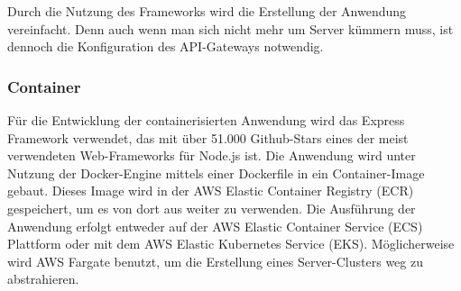 Durch die Nutzung des Frameworks wird die Erstellung der Anwendung vereinfacht. Denn auch wenn man sich nicht mehr um Server kümmern muss, ist dennoch die Konfiguration des API-Gateways notwendig.

\subsubsection{Container}
Für die Entwicklung der containerisierten Anwendung wird das Express Framework verwendet, das mit über 51.000 Github-Stars eines der meist verwendeten Web-Frameworks für Node.js ist. Die Anwendung wird unter Nutzung der Docker-Engine mittels einer Dockerfile in ein Container-Image gebaut. Dieses Image wird in der AWS Elastic Container Registry (ECR) gespeichert, um es von dort aus weiter zu verwenden. 
Die Ausführung der Anwendung erfolgt entweder auf der AWS Elastic Container Service (ECS) Plattform oder mit dem AWS Elastic Kubernetes Service (EKS). Möglicherweise wird AWS Fargate benutzt, um die Erstellung eines Server-Clusters weg zu abstrahieren.